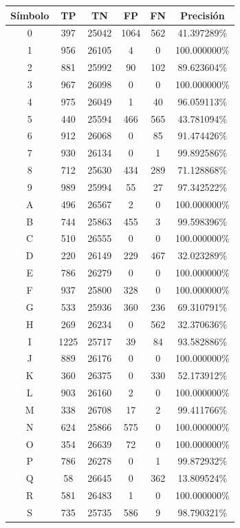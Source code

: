 \documentclass[a4paper, 11pt, oneside]{report}
\begin{document}
\begin{table}
\centering
\begin{tabular}{|c|c|c|c|c|c|}
\hline
Símbolo & TP & TN & FP & FN & Precisión \\ 
\hline
0 & 397 & 25042 & 1064 & 562 & 41.397289\% \\ 
1 & 956 & 26105 & 4 & 0 & 100.000000\% \\ 
2 & 881 & 25992 & 90 & 102 & 89.623604\% \\ 
3 & 967 & 26098 & 0 & 0 & 100.000000\% \\ 
4 & 975 & 26049 & 1 & 40 & 96.059113\% \\ 
5 & 440 & 25594 & 466 & 565 & 43.781094\% \\ 
6 & 912 & 26068 & 0 & 85 & 91.474426\% \\ 
7 & 930 & 26134 & 0 & 1 & 99.892586\% \\ 
8 & 712 & 25630 & 434 & 289 & 71.128868\% \\ 
9 & 989 & 25994 & 55 & 27 & 97.342522\% \\ 
A & 496 & 26567 & 2 & 0 & 100.000000\% \\ 
B & 744 & 25863 & 455 & 3 & 99.598396\% \\ 
C & 510 & 26555 & 0 & 0 & 100.000000\% \\ 
D & 220 & 26149 & 229 & 467 & 32.023289\% \\ 
E & 786 & 26279 & 0 & 0 & 100.000000\% \\ 
F & 937 & 25800 & 328 & 0 & 100.000000\% \\ 
G & 533 & 25936 & 360 & 236 & 69.310791\% \\ 
H & 269 & 26234 & 0 & 562 & 32.370636\% \\ 
I & 1225 & 25717 & 39 & 84 & 93.582886\% \\ 
J & 889 & 26176 & 0 & 0 & 100.000000\% \\ 
K & 360 & 26375 & 0 & 330 & 52.173912\% \\ 
L & 903 & 26160 & 2 & 0 & 100.000000\% \\ 
M & 338 & 26708 & 17 & 2 & 99.411766\% \\ 
N & 624 & 25866 & 575 & 0 & 100.000000\% \\ 
O & 354 & 26639 & 72 & 0 & 100.000000\% \\ 
P & 786 & 26278 & 0 & 1 & 99.872932\% \\ 
Q & 58 & 26645 & 0 & 362 & 13.809524\% \\ 
R & 581 & 26483 & 1 & 0 & 100.000000\% \\ 
S & 735 & 25735 & 586 & 9 & 98.790321\% \\ 

\end{tabular}
\end{table}
\end{document}
